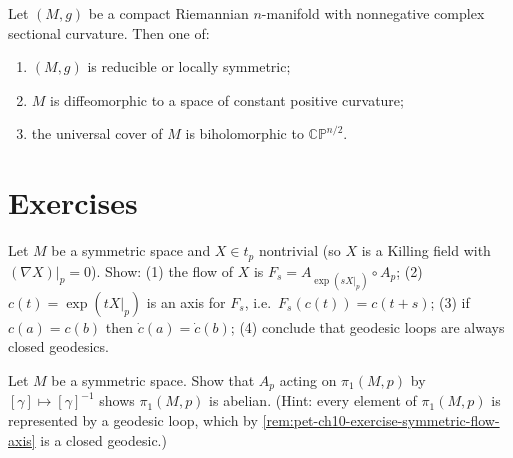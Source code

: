 \begin{theorem}
  \label{thm:pet-ch10-brendle-schoen}

  Let $(M,g)$ be a compact Riemannian $n$-manifold with nonnegative complex
  sectional curvature. Then one of:
  \begin{enumerate}
    \item[(a)] $(M,g)$ is reducible or locally symmetric;
    \item[(b)] $M$ is diffeomorphic to a space of constant positive curvature;
    \item[(c)] the universal cover of $M$ is biholomorphic to $\mathbb{CP}^{n/2}$.
  \end{enumerate}
\end{theorem}

\section{Exercises}

\begin{remark}
  \label{rem:pet-ch10-exercise-symmetric-flow-axis}

  Let $M$ be a symmetric space and $X\in t_p$ nontrivial (so $X$ is a Killing
  field with $(\nabla X)|_p=0$). Show: (1) the flow of $X$ is
  $F_s=A_{\exp(sX|_p)}\circ A_p$; (2) $c(t)=\exp(tX|_p)$ is an axis for $F_s$,
  i.e.\ $F_s(c(t))=c(t+s)$; (3) if $c(a)=c(b)$ then $\dot c(a)=\dot c(b)$;
  (4) conclude that geodesic loops are always closed geodesics.
\end{remark}

\begin{remark}
  \label{rem:pet-ch10-exercise-pi1-abelian}

  Let $M$ be a symmetric space. Show that $A_p$ acting on $\pi_1(M,p)$ by
  $[\gamma]\mapsto[\gamma]^{-1}$ shows $\pi_1(M,p)$ is abelian. (Hint: every
  element of $\pi_1(M,p)$ is represented by a geodesic loop, which by
  \cref{rem:pet-ch10-exercise-symmetric-flow-axis} is a closed geodesic.)
\end{remark}

